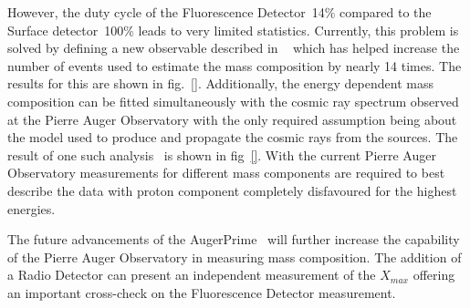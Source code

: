 However, the duty cycle of the Fluorescence Detector~14\% compared to the Surface detector~100\% leads to very limited statistics. Currently, this problem is solved by defining a new observable described in ~\cite{2017arXiv171007249T} which has helped increase the number of events used to estimate the mass composition by nearly 14 times. The results for this are shown in fig.~\ref{}. Additionally, the energy dependent mass composition can be fitted simultaneously with the cosmic ray spectrum observed at the Pierre Auger Observatory with the only required assumption being about the model used to produce and propagate the cosmic rays from the sources. The result of one such analysis~\cite{2018_auger_comp_spec} is shown in fig~\ref{}. With the current Pierre Auger Observatory measurements for different mass components are required to best describe the data with proton component completely disfavoured for the highest energies.   

The future advancements of the AugerPrime~\cite{ANASTASI2022167497} will further increase the capability of the Pierre Auger Observatory in measuring mass composition. The addition of a Radio Detector can present an independent measurement of the $X_{max}$ offering an important cross-check on the Fluorescence Detector measurement. 

